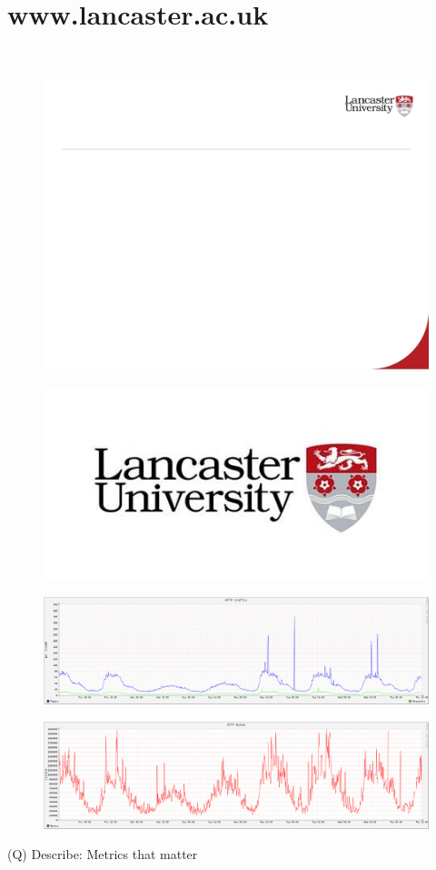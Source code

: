 \documentclass[12pt]{article}
\begin{document}
\section{www.lancaster.ac.uk}
\\
\begin{figure}[H]
\includegraphics[width=0.5\linewidth]{page65-image-1.png}
\end{figure}
\begin{figure}[H]
\includegraphics[width=0.5\linewidth]{page65-image-2.png}
\end{figure}
\begin{figure}[H]
\includegraphics[width=0.5\linewidth]{page65-image-3.png}
\end{figure}
\begin{figure}[H]
\includegraphics[width=0.5\linewidth]{page65-image-4.png}
\end{figure}
\clearpage
(Q)
Describe: Metrics that matter
\clearpage
\end{document}
